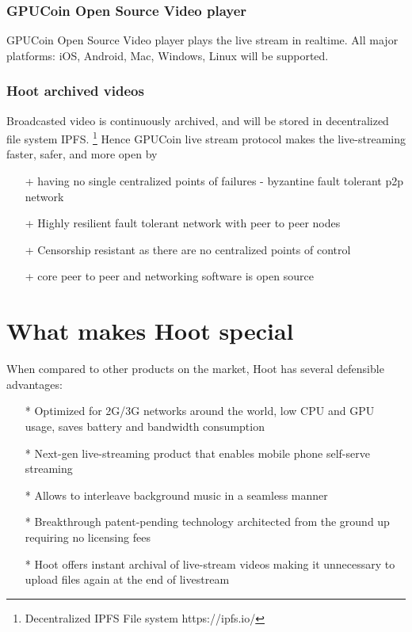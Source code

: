 \documentclass{article}
\begin{document}
\subsubsection{GPUCoin Open Source Video player}
GPUCoin Open Source Video player plays the live stream in realtime. All major platforms: iOS, Android, Mac, Windows, Linux will be supported.

\subsubsection{Hoot archived videos}
Broadcasted video is continuously archived, and will be stored in decentralized file system IPFS. \footnote{Decentralized IPFS File system https://ipfs.io/} Hence GPUCoin live stream protocol makes the live-streaming faster, safer, and more open by
\begin{itemize}
 \item[+]having no single centralized points of failures - byzantine fault tolerant p2p network
 \item[+]Highly resilient fault tolerant network with peer to peer nodes
 \item[+]Censorship resistant as there are no centralized points of control
 \item[+]core peer to peer and networking software is open source
\end{itemize}

\section{What makes Hoot special}
When compared to other products on the market, Hoot has several defensible advantages:
\begin{itemize}
\item[*]Optimized for 2G/3G networks around the world, low CPU and GPU usage, saves battery and bandwidth consumption
\item[*]Next-gen live-streaming product that enables mobile phone self-serve streaming 
\item[*]Allows to interleave background music in a seamless manner
\item[*]Breakthrough patent-pending technology architected from the ground up requiring no licensing fees
\item[*]Hoot offers instant archival of live-stream videos making it unnecessary to upload files again at the end of livestream

\end{itemize}
\end{document}
